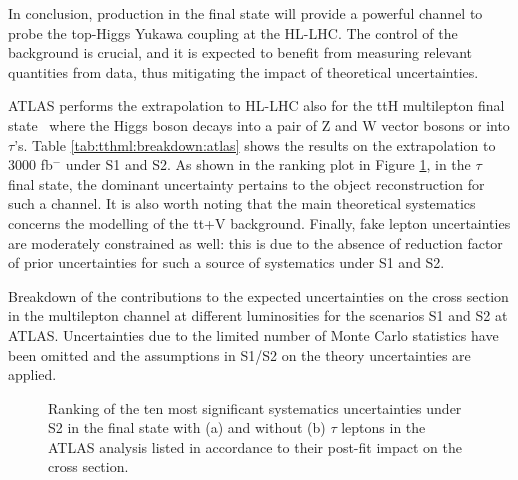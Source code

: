 In conclusion, \ttH production in the \Htobb final state will provide a powerful channel to probe the top-Higgs Yukawa coupling at the HL-LHC.
The control of the \ttHF background is crucial, and it is expected to benefit from measuring relevant quantities from data, thus mitigating the impact of theoretical uncertainties.

ATLAS performs the extrapolation to HL-LHC also for the ttH multilepton final state~\cite{ATLAS-PHYS-PUB-2018-XY} where the Higgs boson decays into a pair of Z and W vector bosons or into $\tau$’s. Table \ref{tab:tthml:breakdown:atlas} shows the results on the extrapolation to 3000 fb$^{-}$ under S1 and S2. As shown in the ranking plot in Figure \ref{fig:tthml:impacts:atlas}, in the $\tau$ final state, the dominant uncertainty pertains to the object reconstruction for such a channel. It is also worth noting that the main theoretical systematics concerns the modelling of the tt+V background. Finally, fake lepton uncertainties are moderately constrained as well: this is due to the absence of reduction factor of prior uncertainties for such a source of systematics under S1 and S2. 
\begin{table}
  \centering
  \caption{
    Breakdown of the contributions to the expected uncertainties on the \ttH cross section in the multilepton channel at different luminosities for the scenarios S1 and S2 at ATLAS. Uncertainties due to the limited number of Monte Carlo statistics have been omitted and the assumptions in S1/S2 on the theory uncertainties are applied.
  }
  \label{tab:tthbb:breakdown:atlas}
\end{table}
\begin{figure}
  \centering
  \caption{
    Ranking of the ten most significant systematics uncertainties under S2 in the \ttH final state with (a) and without (b) $\tau$ leptons in the ATLAS analysis listed in accordance to their post-fit impact on the \ttH cross section.
  }
  \label{fig:tthml:impacts:atlas}
\end{figure}



